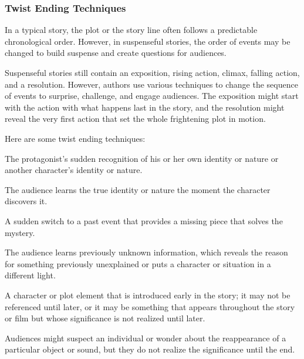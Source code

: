 
\subsubsection{Twist Ending Techniques}
\label{sub_sub_sec:twist_ending_techniques}

In a typical story, the plot or the story line often follows a predictable
chronological order. However, in suspenseful stories, the order of events may
be changed to build suspense and create questions for audiences.

Suspenseful stories still contain an exposition, rising action, climax, falling
action, and a resolution. However, authors use various techniques to change the
sequence of events to surprise, challenge, and engage audiences. The exposition
might start with the action with what happens last in the story, and the
resolution might reveal the very first action that  set the whole frightening
plot in motion.

Here are some twist ending techniques:

\begin{definition}[Discovery]
  \label{def:discovery}

  The protagonist's sudden recognition of his or her own identity or nature or
  another character's identity or nature.

  The audience learns the true identity or nature the moment the character
  discovers it.
\end{definition}

\begin{definition}[Flashback]
  \label{def:flashback}

  A sudden switch to a past event that provides a missing piece that solves the
  mystery.

  The audience learns previously unknown information, which reveals the reason
  for something previously unexplained or puts a character or situation in a
  different light.
\end{definition}

\begin{definition}[Foreshadowing]
  \label{def:foreshadowing}

  A character or plot element that is introduced early in the story; it may not be
  referenced until later, or it may be something that appears throughout the story
  or film but whose significance is not realized until later.

  Audiences might suspect an individual or wonder about the reappearance of a
  particular object or sound, but they do not realize the significance until the
  end.
\end{definition}

